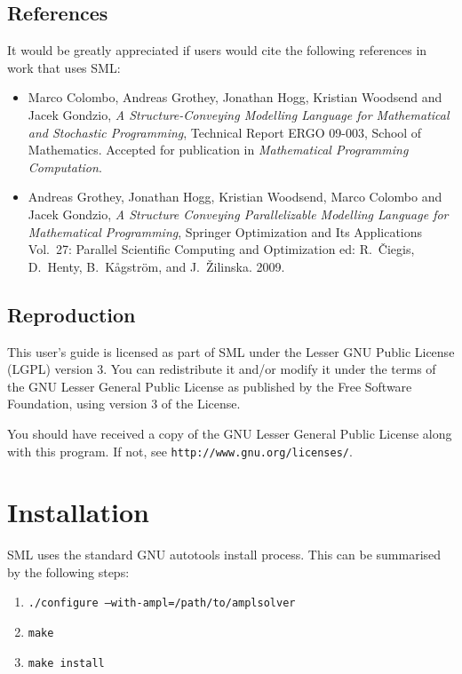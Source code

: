 \documentclass[10pt,a4paper]{report}
\begin{document}
\section*{References}

It would be greatly appreciated if users would cite the following references
in work that uses SML:
\begin{itemize}
  \item {\sc Marco Colombo, Andreas Grothey, Jonathan Hogg, Kristian Woodsend and Jacek Gondzio}, {\it A Structure-Conveying Modelling Language for Mathematical and Stochastic Programming}, {Technical Report ERGO 09-003, School of Mathematics.
    Accepted for publication in {\it Mathematical Programming Computation}.}
   \item {\sc Andreas Grothey, Jonathan Hogg, Kristian Woodsend, Marco Colombo and Jacek Gondzio}, {\it A Structure Conveying Parallelizable Modelling Language for Mathematical Programming}, {Springer Optimization and Its Applications Vol.~27: Parallel Scientific Computing and Optimization ed: R.~\v{C}iegis, D.~Henty,
     B.~K\r{a}gstr\"{o}m, and J.~\v{Z}ilinska. 2009.}
\end{itemize}

\section*{Reproduction}

This user's guide is licensed as part of SML under the Lesser GNU Public
License (LGPL) version 3. You can redistribute it and/or modify it under the
terms of the GNU Lesser General Public License as published by the Free
Software Foundation, using version 3 of the License.

You should have received a copy of the GNU Lesser General Public License
along with this program. If not, see {\tt http://www.gnu.org/licenses/}.

\chapter{Installation}

SML uses the standard GNU autotools install process. This can be summarised
by the following steps:
\begin{enumerate}
   \item {\tt ./configure --with-ampl=/path/to/amplsolver}
   \item {\tt make}
   \item {\tt make install}
\end{enumerate}
\end{document}

